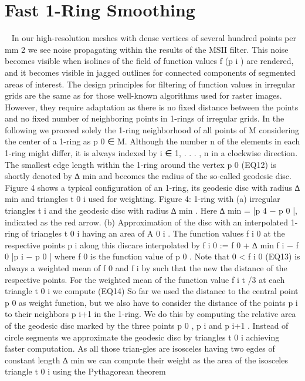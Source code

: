 \documentclass{article}
\begin{document}
\section{Fast 1-Ring Smoothing}~\cite[p.~5]{Mara17}
In our high-resolution meshes with dense vertices of several hundred points per mm 2 we see noise propagating within the results of the MSII filter. This noise becomes visible when isolines of the field of function values f (p i ) are rendered, and it becomes visible in jagged outlines for connected components of segmented areas of interest. The design principles for filtering of function values in irregular grids are the same as for those well-known algorithms used for raster images. However, they require adaptation as there is no fixed distance between the points and no fixed number of neighboring points in 1-rings of irregular grids. In the following we proceed solely the 1-ring neighborhood of all points of M considering the center of a 1-ring as p 0 ∈ M. Although the number n of the elements in each 1-ring might differ, it is always indexed by i ∈ {1, . . . , n} in a clockwise direction. The smallest edge length within the 1-ring around the vertex p 0 
(EQ12)
is shortly denoted by ∆ min and becomes the radius of the so-called geodesic disc. Figure 4 shows a typical configuration of an 1-ring, its geodesic disc with radius ∆ min and triangles t 0 i used for weighting.
Figure 4: 1-ring with (a) irregular triangles t i and the geodesic disc with radius ∆ min . Here ∆ min = |p 4 − p 0 |, indicated as the red arrow. (b) Approximation of the disc with an interpolated 1-ring of triangles t 0 i having an area of A 0 i . 
The function values f i 0 at the respective points p i along this discare interpolated by f i 0 := f 0 + ∆ min f i − f 0 |p i − p 0 | where f 0 is the function value of p 0 . Note that 0 < f i 0
(EQ13)
is always a weighted mean of f 0 and f i by such that the new the distance of the respective points. For the weighted mean of the function value f i t /3 at each triangle t 0 i we compute
(EQ14)
So far we used the distance to the central point p 0 as weight function, but we also have to consider the distance of the points p i to their neighbors p i+1 in the 1-ring. We do this by computing the relative area of the geodesic disc marked by the three points p 0 , p i and p i+1 . Instead of circle segments we approximate the geodesic disc by triangles t 0 i achieving faster computation. As all those trian-gles are isosceles having two egdes of constant length ∆ min we can compute their weight as the area of the isosceles triangle t 0 i using the Pythagorean theorem
\end{document}
